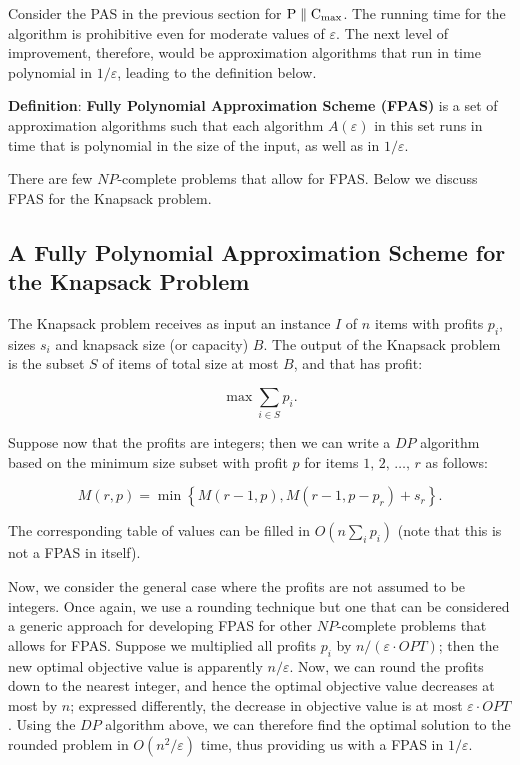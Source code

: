 \documentclass{article}
\begin{document}
Consider the PAS in the previous section for ${\rm P \parallel C_{\max}}$. The running time for
the algorithm is prohibitive even for moderate values of $\varepsilon$. The next level of
improvement, therefore, would be approximation algorithms that run in time polynomial in $1/
\varepsilon$, leading to the definition below.

\textbf{Definition}:
\textbf{Fully Polynomial Approximation Scheme (FPAS)} is a set of approximation algorithms such
that each algorithm $A(\varepsilon)$ in this set runs in time that is polynomial in the size of
the input, as well as in $1/ \varepsilon$.

There are few $NP$-complete problems that allow for FPAS. Below we discuss FPAS for the Knapsack
problem.

\subsection{A Fully Polynomial Approximation Scheme for the Knapsack Problem}

The Knapsack problem receives as input an instance $I$ of $n$ items with profits $p_i$, sizes
$s_i$ and knapsack size (or capacity) $B$. The output of the Knapsack problem is the subset $S$ of
items of total size at most $B$, and that has profit:

$$
\max \sum\limits_{i \in S} p_i.
$$

Suppose now that the profits are integers; then we can write a $DP$ algorithm based on the minimum
size subset with profit $p$ for items $1, \, 2, \, \ldots, \, r$ as follows:

$$
M(r,p) = \min \left\{ M(r-1,p), M(r-1, p-p_r) + s_r \right\}.
$$

The corresponding table of values can be filled in $O\left(n \sum_i p_i \right)$ (note that this
is not a FPAS in itself).

Now, we consider the general case where the profits are not assumed to be integers. Once again, we
use a rounding technique but one that can be considered a generic approach for developing FPAS for
other $NP$-complete problems that allows for FPAS. Suppose we multiplied all profits $p_i$ by
$n/(\varepsilon \cdot OPT)$; then the new optimal objective value is apparently $n/\varepsilon$.
Now, we can round the profits down to the nearest integer, and hence the optimal objective value
decreases at most by $n$; expressed differently, the decrease in objective value is at most
$\varepsilon \cdot OPT$. Using the $DP$ algorithm above, we can therefore find the optimal
solution to the rounded problem in $O(n^2/ \varepsilon)$ time, thus providing us with a FPAS in
$1/\varepsilon$.
\end{document}
